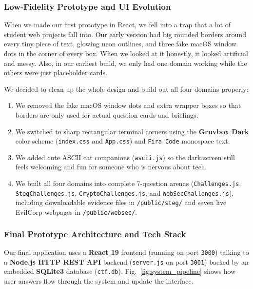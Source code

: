 \documentclass[11pt,a4paper]{article}
\begin{document}
\subsubsection{Low-Fidelity Prototype and UI Evolution}
When we made our first prototype in React, we fell into a trap that a lot of student web projects fall into. Our early version had big rounded borders around every tiny piece of text, glowing neon outlines, and three fake macOS window dots in the corner of every box. When we looked at it honestly, it looked artificial and messy. Also, in our earliest build, we only had one domain working while the others were just placeholder cards.

We decided to clean up the whole design and build out all four domains properly:
\begin{enumerate}
    \item We removed the fake macOS window dots and extra wrapper boxes so that borders are only used for actual question cards and briefings.
    \item We switched to sharp rectangular terminal corners using the \textbf{Gruvbox Dark} color scheme (\texttt{index.css} and \texttt{App.css}) and \texttt{Fira Code} monospace text.
    \item We added cute ASCII cat companions (\texttt{ascii.js}) so the dark screen still feels welcoming and fun for someone who is nervous about tech.
    \item We built all four domains into complete 7-question arenas (\texttt{Challenges.js}, \texttt{StegChallenges.js}, \texttt{CryptoChallenges.js}, and \texttt{WebSecChallenges.js}), including downloadable evidence files in \texttt{/public/steg/} and seven live EvilCorp webpages in \texttt{/public/websec/}.
\end{enumerate}

\subsubsection{Final Prototype Architecture and Tech Stack}
Our final application uses a \textbf{React 19} frontend (running on port \texttt{3000}) talking to a \textbf{Node.js HTTP REST API} backend (\texttt{server.js} on port \texttt{3001}) backed by an embedded \textbf{SQLite3} database (\texttt{ctf.db}). Fig.~\ref{fig:system_pipeline} shows how user answers flow through the system and update the interface.
\end{document}
